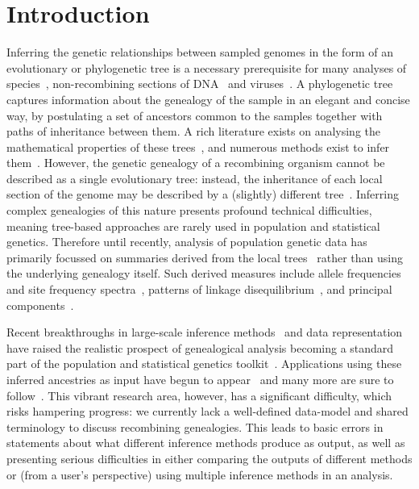 \documentclass{article}
\begin{document}
\section*{Introduction}
Inferring the genetic relationships between sampled genomes in the form of an
evolutionary or phylogenetic tree is a necessary prerequisite for many analyses of
species~\citep{rannala2003genetics}, non-recombining sections of
DNA~\citep{cann1987mitochondrial,underhill2001annalsofhumangenetics}
and viruses~\citep{grenfell2004science}.
A phylogenetic tree captures information about the genealogy
of the sample in an elegant and concise
way, by postulating a set of ancestors common to the samples
together with paths of inheritance between them. A rich literature exists
on analysing the mathematical properties of these
trees~\citep{steel2016phylogeny}, and numerous
methods exist to infer them~\citep{felsenstein2004inferring}.
However, the genetic genealogy of a recombining organism
cannot be described as a single evolutionary tree: instead,
the inheritance of each local section of the genome may be described
by a (slightly) different tree~\citet{hudson1983properties}. Inferring complex
genealogies of this nature
presents profound technical difficulties, meaning tree-based approaches are
rarely used in population and statistical genetics. Therefore until recently, analysis of
population genetic data has primarily focussed on summaries derived
from the local trees~\citep{tajima1983evolutionary,tavare1984line}
rather than using the underlying genealogy itself. Such
derived measures include allele frequencies and site frequency
spectra~\citep{achaz2009frequency,ralph2020efficiently},
patterns of linkage disequilibrium~\citep{mcvean2002genealogical}, and
principal components~\citep{mcvean2009genealogical}.

Recent breakthroughs in large-scale inference
methods~\citep{rasmussen2014genome,kelleher2019inferring,speidel2019method,wohns2022unified}
and data representation~\citep{kelleher2016efficient}
have raised the realistic prospect of genealogical analysis becoming a standard part
of the population and statistical genetics toolkit~\citep{hejase2020summary}.
Applications using these inferred ancestries as input have begun to
appear~\citep{osmond2021estimating,zhang2021biobank,fan2022genealogical,hejase2022deep}
and many more are sure to
follow~\citep{harris2019database}. This vibrant research area, however,
has a significant difficulty, which risks hampering
progress: we currently lack a well-defined data-model and shared terminology
to discuss recombining genealogies. This leads to basic errors in statements
about what different inference methods produce as output, as well as presenting serious
difficulties in either comparing the outputs of different methods or
(from a user's perspective) using multiple inference methods in an analysis.
\end{document}
